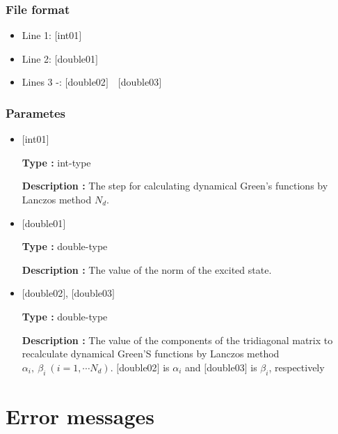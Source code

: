 \subsubsection{File format}
 \begin{itemize}
   \item  Line 1: $[$int01$]$
   \item  Line 2: $[$double01$]$
   \item  Lines 3 -: $[$double02$]$~~$[$double03$]$
  \end{itemize}
\subsubsection{Parametes}
 \begin{itemize}

  \item  $[$int01$]$

 {\bf Type :} int-type

 {\bf Description :} The step for calculating dynamical Green's functions by Lanczos method $N_d$.

  \item  $[$double01$]$

 {\bf Type :} double-type

{\bf Description :} The value of the norm of the excited state.
 
 \item  $[$double02$]$, $[$double03$]$

 {\bf Type :} double-type

{\bf Description :} The value of the components of the tridiagonal matrix to recalculate dynamical Green'S functions by Lanczos method $\alpha_i,~\beta_i~(i =1,\cdots N_d)$.
$[$double02$]$ is $\alpha_i$ and $[$double03$]$ is $\beta_i$, respectively\\
\end{itemize}

\newpage
\section{Error messages}

